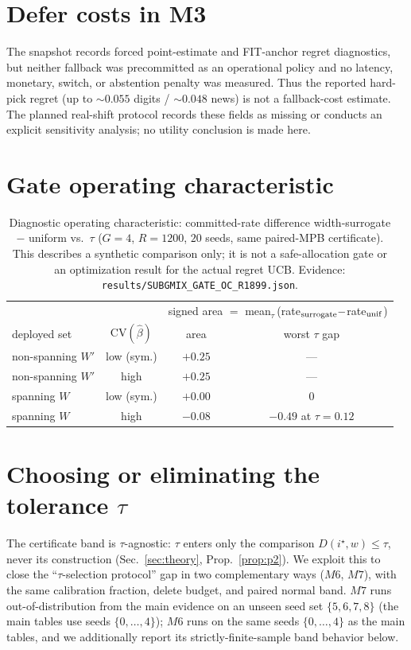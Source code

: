 \documentclass{article}
\begin{document}
\section{Defer costs in M3}
\label{app:m3}
The snapshot records forced point-estimate and FIT-anchor regret diagnostics, but neither
fallback was precommitted as an operational policy and no latency, monetary, switch, or
abstention penalty was measured. Thus the reported hard-pick regret (up to $\sim0.055$ digits /
$\sim0.048$ news) is not a fallback-cost estimate. The planned real-shift protocol records
these fields as missing or conducts an explicit sensitivity analysis; no utility conclusion is
made here.

\section{Gate operating characteristic}
\label{app:gateoc}
\begin{table}[h]
\centering\small\setlength{\tabcolsep}{4pt}
\begin{tabular}{lccc}
\toprule
& & \multicolumn{2}{c}{signed area $=$ mean$_\tau$\,(rate$_{\rm surrogate}-$rate$_{\rm unif}$)} \\
deployed set & $\mathrm{CV}(\hat\beta)$ & area & worst $\tau$ gap \\
\midrule
non-spanning $W'$ & low (sym.) & $+0.25$ & --- \\
non-spanning $W'$ & high & $+0.25$ & --- \\
spanning $W$ & low (sym.) & $+0.00$ & $0$ \\
spanning $W$ & high & $-0.08$ & $-0.49$ at $\tau{=}0.12$ \\
\bottomrule
\end{tabular}
\caption{Diagnostic operating characteristic: committed-rate difference width-surrogate $-$
uniform vs.\ $\tau$ ($G{=}4$, $R{=}1200$, $20$ seeds, same paired-MPB certificate). This
describes a synthetic comparison only; it is not a safe-allocation gate or an optimization
result for the actual regret UCB. Evidence:
\texttt{results/SUBGMIX\_GATE\_OC\_R1899.json}.}
\label{tab:gateoc}
\end{table}

\section{Choosing or eliminating the tolerance $\tau$}
\label{app:tau}
The certificate band is $\tau$-agnostic: $\tau$ enters only the comparison
$D(i^\star,w)\le\tau$, never its construction (Sec.~\ref{sec:theory}, Prop.~\ref{prop:p2}).
We exploit this to close the ``$\tau$-selection protocol'' gap in two complementary ways
($M6$, $M7$), with the same calibration fraction, delete budget, and paired normal band.
$M7$ runs out-of-distribution from the main evidence on an unseen seed set
$\{5,6,7,8\}$ (the main tables use seeds $\{0,\dots,4\}$); $M6$ runs on the same seeds
$\{0,\dots,4\}$ as the main tables, and we additionally report its strictly-finite-sample
band behavior below.
\end{document}
